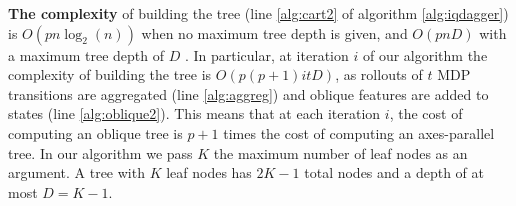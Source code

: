 \begin{table}
\centering
\vspace{-0.5mm}
\caption{ \textbf{\small Automated masking reduces the number of features in MDP}, illustrated on $8$ Atari environments.}
\setlength{\tabcolsep}{3pt}
\label{tab:repartitions}
\end{table}

\textbf{The complexity} of building the tree (line \ref{alg:cart2} of algorithm \ref{alg:iqdagger}) is $O(pn\log_2(n))$ when no maximum tree depth is given, and $O(pnD)$ with a maximum tree depth of $D$ \citep{complexcart}. 
In particular, at iteration $i$ of our algorithm the complexity of building the tree is $O(p(p+1)itD)$, as rollouts of $t$ MDP transitions are aggregated (line \ref{alg:aggreg}) and oblique features are added to states (line \ref{alg:oblique2}). 
This means that at each iteration $i$, the cost of computing an oblique tree is $p+1$ times the cost of computing an axes-parallel tree. In our algorithm we pass $K$ the maximum number of leaf nodes as an argument. A tree with $K$ leaf nodes has $2K - 1$ total nodes and a depth of at most $D=K-1$.

